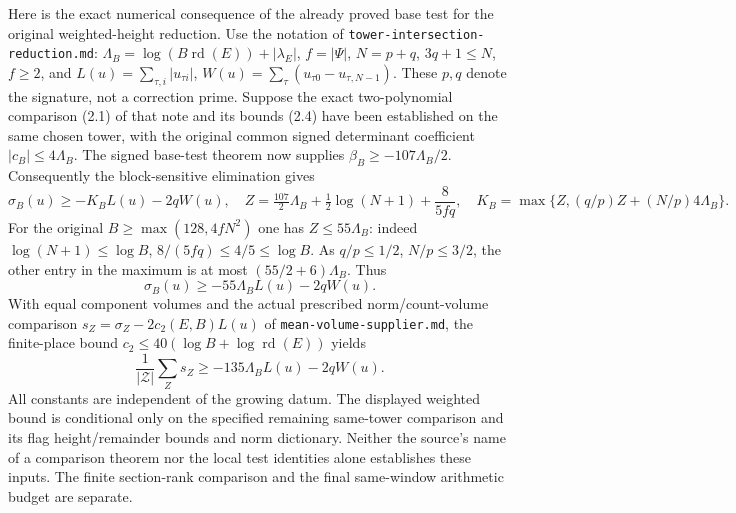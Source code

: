 Here is the exact numerical consequence of the already proved
base test for the original weighted-height reduction.
Use the notation of \texttt{tower-intersection-reduction.md}:
\(\Lambda_B=\log(B\operatorname{rd}(E))+|\lambda_E|\),
\(f=|\Psi|\), \(N=p+q\), \(3q+1\le N\), \(f\ge2\),
and \(L(u)=\sum_{\tau,i}|u_{\tau i}|\),
\(W(u)=\sum_\tau(u_{\tau0}-u_{\tau,N-1})\).
These \(p,q\) denote the signature, not a correction prime.
Suppose the exact two-polynomial comparison (2.1) of that
note and its bounds (2.4) have been established on the
same chosen tower, with the original common signed
determinant coefficient \(|c_B|\le4\Lambda_B\).
The signed base-test theorem now supplies
\(\beta_B\ge-107\Lambda_B/2\).
Consequently the block-sensitive elimination gives
\[
 \sigma_B(u)\ge
 -K_BL(u)-2qW(u),
 \quad
 Z=\tfrac{107}{2}\Lambda_B+
       \tfrac12\log(N+1)+\frac8{5fq},
 \quad
 K_B=\max\{Z,(q/p)Z+(N/p)4\Lambda_B\}.
\]
For the original \(B\ge\max(128,4fN^2)\) one has
\(Z\le55\Lambda_B\): indeed
\(\log(N+1)\le\log B\), \(8/(5fq)\le4/5\le\log B\).
As \(q/p\le1/2\), \(N/p\le3/2\), the other entry in the
maximum is at most \((55/2+6)\Lambda_B\).
Thus
\begin{equation}\label{eq:geometry-conditional-mean55}
 \sigma_B(u)\ge-55\Lambda_BL(u)-2qW(u).
\end{equation}
With equal component volumes and the actual prescribed
norm/count-volume comparison \(s_Z=\sigma_Z-2c_2(E,B)L(u)\)
of \texttt{mean-volume-supplier.md}, the finite-place
bound \(c_2\le40(\log B+\log\operatorname{rd}(E))\) yields
\[
 \frac1{|\mathcal Z|}\sum_Zs_Z\ge
       -135\Lambda_BL(u)-2qW(u).
\]
All constants are independent of the growing datum.
The displayed weighted bound is conditional only on the
specified remaining same-tower comparison and its flag
height/remainder bounds and norm dictionary. Neither
the source's name of a comparison theorem nor the
local test identities alone establishes these inputs.
The finite section-rank comparison and the final
same-window arithmetic budget are separate.
